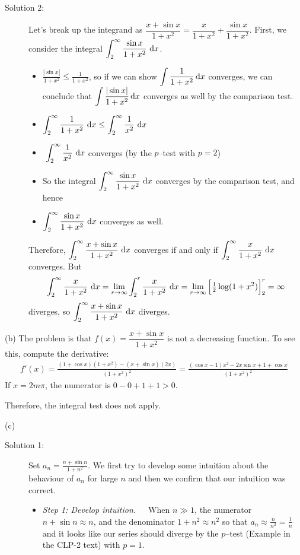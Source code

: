 \begin{solution}
\begin{description}
\item[Solution 2:]
Let's break up the integrand as $\dfrac{x+\sin x}{1+x^2} = \dfrac{x}{1+x^2}+\dfrac{\sin x}{1+x^2}$. First, we consider  the integral $\displaystyle \int_2^\infty\frac{\sin x}{1+x^2}\ \mathrm{d}x$.
\begin{itemize}
\item  $\displaystyle\frac{|\sin x|}{1+x^2}\le \frac{1}{1+x^2}$, so if we can show $\displaystyle\int \frac{1}{1+x^2}\,\mathrm{d}x$ converges, we can conclude that $\displaystyle\int\frac{|\sin x|}{1+x^2}\,\mathrm{d}x$ converges as well by the comparison test.
\item  $\displaystyle\int_2^\infty\frac{1}{1+x^2}\ \dee{x}\le \int_2^\infty\frac{1}{x^2}\ \dee{x}$
\item  $\displaystyle\ \int_2^\infty\frac{1}{x^2}\ \dee{x}$
converges (by the $p$--test with $p=2$)
\item So the integral $\displaystyle \int_2^\infty\frac{\sin x}{1+x^2}\ \mathrm{d}x$ converges by the comparison test, and hence
\item  $\displaystyle \int_2^\infty\frac{\sin x}{1+x^2}\ \mathrm{d}x$ converges as well.
\end{itemize}
Therefore, $\displaystyle \int_2^\infty\frac{x+\sin x}{1+x^2}\ \dee{x}$ converges if and only
if $\displaystyle \int_2^\infty\frac{x}{1+x^2}\ \mathrm{d}x$ converges. But
\begin{align*}
\int_2^\infty\frac{x}{1+x^2}\ \mathrm{d}x
=\lim_{r\rightarrow\infty}\int_2^r\frac{x}{1+x^2}\ \mathrm{d}x
=\lim_{r\rightarrow\infty}\Big[\tfrac{1}{2}\log(1+x^2)\Big]_2^r=\infty
\end{align*}
diverges, so $ \displaystyle\int_2^\infty\frac{x+\sin x}{1+x^2}\ \dee{x}$
diverges.
\end{description}

\noindent (b)
The problem is that $f(x)=\dfrac{x+\sin x}{1+x^2}$ is not
a decreasing function. To see this, compute the derivative:
\begin{align*}
f'(x)=\frac{(1+\cos x)(1+x^2)-(x+\sin x)(2x)}{{(1+x^2)}^2}
=\frac{(\cos x-1)x^2-2x\sin x +1+\cos x}{{(1+x^2)}^2}
\end{align*}
If $x=2m\pi$, the numerator is $0-0+1+1>0$.

Therefore, the integral test does not apply.

\noindent (c)
\begin{description}
\item[Solution 1:]
Set $a_n=  \frac{n+\sin n}{1+n^2}$.  We first try to develop some
intuition about the behaviour of $a_n$ for large $n$ and then we confirm
that our intuition was correct.
\begin{itemize}
\item \emph{Step 1: Develop intuition.}\ \ \
When $n\gg 1$,
the numerator $n+\sin n\approx n$, and the denominator
$1+n^2\approx n^2$ so that
$a_n\approx \frac{n}{n^2}=\frac{1}{n}$ and it looks like
our series should diverge by the $p$--test (Example 
in the CLP-2 text) with $p=1$.


\end{itemize}
\end{description}
\end{solution}

